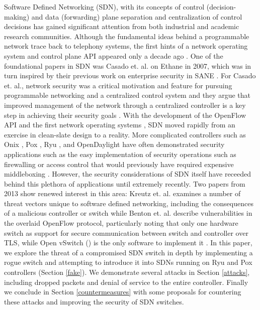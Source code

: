 Software Defined Networking (SDN), with its concepts of control (decision-making) and data (forwarding) plane separation and centralization of control decisions has gained significant attention from both industrial and academic research communities.  Although the fundamental ideas behind a programmable network trace back to telephony systems, the first hints of a network operating system and control plane API appeared only a decade ago \cite{history}.  One of the foundational papers in SDN was Casado et. al. on Ethane in 2007\cite{ethane}, which was in turn inspired by their previous work on enterprise security in SANE \cite{sane}.  For Casado et. al., network security was a critical motivation and feature for pursuing programmable networking and a centralized control system and they argue that improved management of the network through a centralized controller is a key step in achieving their security goals \cite{ethane}.
With the development of the OpenFlow API and the first network operating systems \cite{openflow}\cite{nox}, SDN moved rapidly from an exercise in clean-slate design to a reality.  More complicated controllers such as Onix \cite{onix}, Pox \cite{pox}, Ryu \cite{ryu}, and OpenDaylight\cite{opendaylight} have often demonstrated security applications such as the easy implementation of security operations such as firewalling or access control that would previously have required expensive middleboxing \cite{resonance}.  However, the security considerations of SDN itself have receeded behind this plethora of applications until extremely recently.  Two papers from 2013 show renewed interest in this area: Kreutz et. al. examines a number of threat vectors unique to software defined networking, including the consequences of a malicious controller or switch \cite{sdnsec} while Benton et. al. describe vulnerabilities in the overlaid OpenFlow protocol, particularly noting that only one hardware switch as support for secure communication between switch and controller over TLS, while Open vSwitch (\cite{openvswitch}) is the only software to implement it \cite{benton}.
In this paper, we explore the threat of a compromised SDN switch in depth by implementing a rogue switch and attempting to introduce it into SDNs running on Ryu and Pox controllers (Section \ref{fake}).  We demonstrate several attacks in Section \ref{attacks}, including dropped packets and denial of service to the entire controller.  Finally we conclude in Section \ref{countermeasures} with some proposals for countering these attacks and improving the security of SDN switches.




